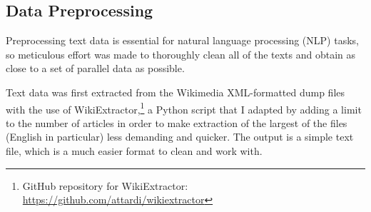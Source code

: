 \documentclass[12pt,a4paper]{article}
\numberwithin{figure}{section}
\numberwithin{table}{section}
\numberwithin{definition}{section}
\begin{document}
\subsection{Data Preprocessing}
\label{ssec:datapreprocessing}


Preprocessing text data is essential for natural language processing (NLP) tasks, so meticulous effort was made to thoroughly clean all of the texts and obtain as close to a set of parallel data as possible.

Text data was first extracted from the Wikimedia XML-formatted dump files with the use of WikiExtractor,\footnote{GitHub repository for WikiExtractor: \url{https://github.com/attardi/wikiextractor}} a Python script \parencite{Attardi2015wikiextractor} that I adapted by adding a limit to the number of articles in order to make extraction of the largest of the files (English in particular) less demanding and quicker. The output is a simple text file, which is a much easier format to clean and work with. 
\end{document}
